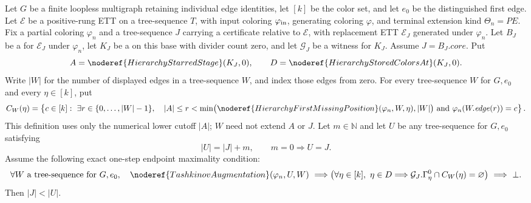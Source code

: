 \begin{helper}
Let $G$ be a finite loopless multigraph retaining individual edge
identities, let $[k]$ be the color set, and let $e_0$ be the distinguished
first edge.  Let $\mathcal E$ be a positive-rung ETT on a tree-sequence
$T$, with input coloring $\varphi_{\rm in}$, generating coloring
$\varphi$, and terminal extension kind $\Theta_n=PE$.  Fix a
partial coloring $\varphi_n$ and a tree-sequence $J$ carrying a
 certificate relative to
$\mathcal E$, with replacement ETT $\mathcal E_J$ generated under
$\varphi_n$.  Let $B_J$ be a  for $\mathcal E_J$
under $\varphi_n$, let $K_J$ be a  on this
base with divider count zero, and let $\mathcal G_J$ be a
 witness for $K_J$.  Assume
$J=B_J.\mathit{core}$.  Put
\[
 A=\noderef{HierarchyStarredStage}(K_J,0),\qquad
 D=\noderef{HierarchyStoredColorsAt}(K_J,0).
\]
Write $|W|$ for the number of displayed edges in a tree-sequence $W$, and
index those edges from zero.  For every tree-sequence $W$ for $G,e_0$
and every $\eta\in[k]$, put
\[
 C_W(\eta)=\left\{c\in[k]:\ \exists r\in\{0,\ldots,|W|-1\},\quad
 |A|\leq r<\min\bigl(
   \noderef{HierarchyFirstMissingPosition}(\varphi_n,W,\eta),|W|\bigr)
 \ \text{and}\ \varphi_n(W.\mathit{edge}(r))=c\right\}.
\]
This definition uses only the numerical lower cutoff $|A|$; $W$ need
not extend $A$ or $J$.  Let $m\in\mathbb N$ and let $U$ be any
tree-sequence for $G,e_0$ satisfying
\[
 |U|=|J|+m,
 \qquad m=0\Longrightarrow U=J.
\]
Assume the following exact one-step endpoint maximality condition:
\[
 \forall W\text{ a tree-sequence for }G,e_0,\quad
 \noderef{TashkinovAugmentation}(\varphi_n,U,W)
 \ \Longrightarrow
 \bigl(\forall\eta\in[k],\ \eta\in D\Longrightarrow
   \mathcal G_J.\Gamma^0_\eta\cap C_W(\eta)=\varnothing\bigr)
 \ \Longrightarrow\ \bot.
\]
Then $|J|<|U|$.
\end{helper}
